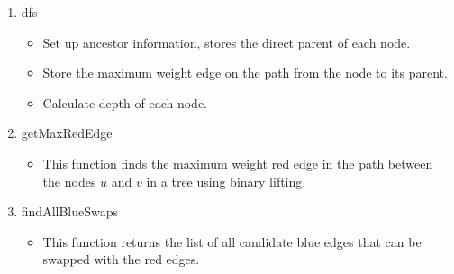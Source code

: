 \documentclass{report}
\begin{document}
\begin{titlepage}
\begin{enumerate}[label={\fontsize{14}{16}\selectfont \arabic*.}]
\begin{enumerate}
\begin{itemize}
                            \item This function extracts the number of red
                                  edges and the cost of the MST, given the edge
                                  list of a MST.

                        \end{itemize}
                        \vspace{0.8em}

                  \item {\fontsize{13}{14} \selectfont dfs}

                        \begin{itemize}

                            \fontsize{12}{14} \selectfont

                            \item Set up ancestor information, stores the
                                  direct parent of each node.
                            \item Store the maximum weight edge on the path
                                  from the node to its parent.
                            \item Calculate depth of each node.

                        \end{itemize}
                        \vspace{0.8em}

                  \item {\fontsize{13}{14} \selectfont getMaxRedEdge}

                        \begin{itemize}

                            \fontsize{12}{14} \selectfont

                            \item This function finds the maximum weight red
                                  edge in the path between the nodes $u$ and
                                  $v$ in a tree using binary lifting.

                        \end{itemize}
                        \vspace{0.8em}

                  \item {\fontsize{13}{14} \selectfont findAllBlueSwaps}

                        \begin{itemize}
                            \fontsize{12}{14} \selectfont
                            \item This function returns the list of all
                                  candidate blue edges that can be swapped with
                                  the red edges.


\end{itemize}
\end{enumerate}
\end{enumerate}
\end{titlepage}
\end{document}
